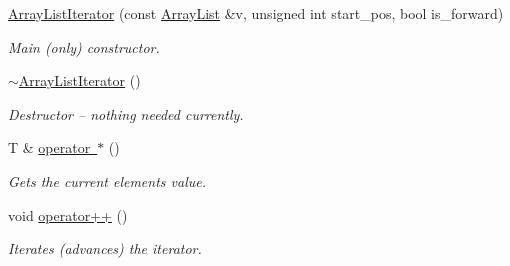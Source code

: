 \begin{DoxyCompactItemize}
\item 
\mbox{\label{classssuds_1_1_array_list_1_1_array_list_iterator_ac04270dc7e378d753e710524d6f2460e}} 
\mbox{\hyperlink{classssuds_1_1_array_list_1_1_array_list_iterator_ac04270dc7e378d753e710524d6f2460e}{Array\+List\+Iterator}} (const \mbox{\hyperlink{classssuds_1_1_array_list}{Array\+List}} \&v, unsigned int start\+\_\+pos, bool is\+\_\+forward)
\begin{DoxyCompactList}\small\item\em Main (only) constructor. \end{DoxyCompactList}\item 
\mbox{\label{classssuds_1_1_array_list_1_1_array_list_iterator_af6b60c4c13aafc4adfac67a1d7e74f6a}} 
\mbox{\hyperlink{classssuds_1_1_array_list_1_1_array_list_iterator_af6b60c4c13aafc4adfac67a1d7e74f6a}{$\sim$\+Array\+List\+Iterator}} ()
\begin{DoxyCompactList}\small\item\em Destructor -- nothing needed currently. \end{DoxyCompactList}\item 
\mbox{\label{classssuds_1_1_array_list_1_1_array_list_iterator_a1ce493737f9a4b75c282b32d77d39226}} 
T \& \mbox{\hyperlink{classssuds_1_1_array_list_1_1_array_list_iterator_a1ce493737f9a4b75c282b32d77d39226}{operator $\ast$}} ()
\begin{DoxyCompactList}\small\item\em Gets the current element\textquotesingle{}s value. \end{DoxyCompactList}\item 
\mbox{\label{classssuds_1_1_array_list_1_1_array_list_iterator_ad5773c320087bba4872892832005320e}} 
void \mbox{\hyperlink{classssuds_1_1_array_list_1_1_array_list_iterator_ad5773c320087bba4872892832005320e}{operator++}} ()
\begin{DoxyCompactList}\small\item\em Iterates (advances) the iterator. \end{DoxyCompactList}\item 
\mbox{\label{classssuds_1_1_array_list_1_1_array_list_iterator_abe82e1a8e5e26286392ecf44eee74cf9}} 

\end{DoxyCompactItemize}
